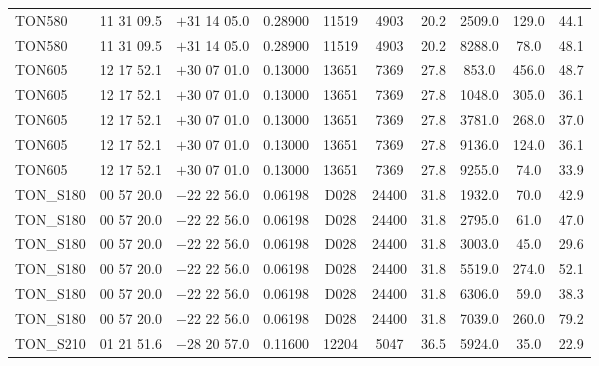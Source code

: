 \begin{landscape}
\begin{center}
\begin{longtable}{l c c c c c c c c c}
TON580  &                  11 31 09.5  &         $+$31 14 05.0  &       0.28900  & 11519  &   4903  &       20.2  &      2509.0  &  129.0  &  44.1  \\
TON580  &                  11 31 09.5  &         $+$31 14 05.0  &       0.28900  & 11519  &   4903  &       20.2  &      8288.0  &  78.0  &   48.1  \\
TON605  &                  12 17 52.1  &         $+$30 07 01.0  &       0.13000  & 13651  &   7369  &       27.8  &      853.0  &   456.0  &  48.7  \\
TON605  &                  12 17 52.1  &         $+$30 07 01.0  &       0.13000  & 13651  &   7369  &       27.8  &      1048.0  &  305.0  &  36.1  \\
TON605  &                  12 17 52.1  &         $+$30 07 01.0  &       0.13000  & 13651  &   7369  &       27.8  &      3781.0  &  268.0  &  37.0  \\
TON605  &                  12 17 52.1  &         $+$30 07 01.0  &       0.13000  & 13651  &   7369  &       27.8  &      9136.0  &  124.0  &  36.1  \\
TON605  &                  12 17 52.1  &         $+$30 07 01.0  &       0.13000  & 13651  &   7369  &       27.8  &      9255.0  &  74.0  &   33.9  \\
TON\_S180  &               00 57 20.0  &         $-$22 22 56.0  &       0.06198  & D028  &    24400  &      31.8  &      1932.0  &  70.0  &   42.9  \\
TON\_S180  &               00 57 20.0  &         $-$22 22 56.0  &       0.06198  & D028  &    24400  &      31.8  &      2795.0  &  61.0  &   47.0  \\
TON\_S180  &               00 57 20.0  &         $-$22 22 56.0  &       0.06198  & D028  &    24400  &      31.8  &      3003.0  &  45.0  &   29.6  \\
TON\_S180  &               00 57 20.0  &         $-$22 22 56.0  &       0.06198  & D028  &    24400  &      31.8  &      5519.0  &  274.0  &  52.1  \\
TON\_S180  &               00 57 20.0  &         $-$22 22 56.0  &       0.06198  & D028  &    24400  &      31.8  &      6306.0  &  59.0  &   38.3  \\
TON\_S180  &               00 57 20.0  &         $-$22 22 56.0  &       0.06198  & D028  &    24400  &      31.8  &      7039.0  &  260.0  &  79.2  \\
TON\_S210  &               01 21 51.6  &         $-$28 20 57.0  &       0.11600  & 12204  &   5047  &       36.5  &      5924.0  &  35.0  &   22.9  \\

\end{longtable}
\end{center}
\end{landscape}
